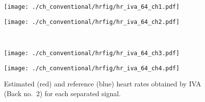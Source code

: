 \begin{figure}[htbp]
     \begin{minipage}[t]{0.45\hsize}
        \centering
        \texttt{[image: ./ch\_conventional/hrfig/hr\_iva\_64\_ch1.pdf]}
        \label{fig:hriva32ch1}
      \end{minipage} 
      \begin{minipage}[t]{0.45\hsize}
        \centering
        \texttt{[image: ./ch\_conventional/hrfig/hr\_iva\_64\_ch2.pdf]}
        \label{fig:hriva32ch2}
      \end{minipage} \\
      \begin{minipage}[t]{0.45\hsize}
        \centering
        \texttt{[image: ./ch\_conventional/hrfig/hr\_iva\_64\_ch3.pdf]}
        \label{fig:hriva32ch3}
      \end{minipage} 
      \begin{minipage}[t]{0.45\hsize}
        \centering
        \texttt{[image: ./ch\_conventional/hrfig/hr\_iva\_64\_ch4.pdf]}
        \label{fig:hriva32ch4}
      \end{minipage} 
     \caption{Estimated (red) and reference (blue) heart rates obtained by IVA (Back no.~2) for each separated signal.}
     \label{fig:hriva}
  \end{figure}

